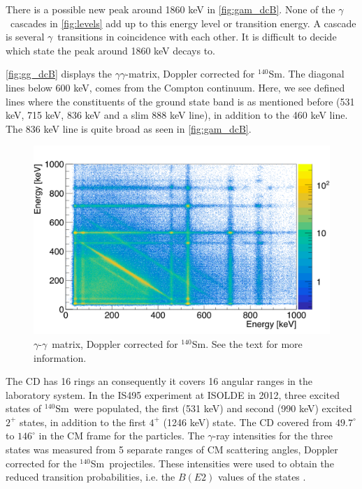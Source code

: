 \documentclass[twoside,english]{uiofysmaster/uiofysmaster}
\newcommand{\Sm}{$^{140}$Sm} %
\newcommand{\ga}{$\gamma$}
\let\orgautoref\autoref
\renewcommand{\autoref}
        {%
		 \def\sectionautorefname{Section}%
		 \def\subsectionautorefname{Section}%
		 \def\subsubsectionautorefname{Section}%
		 \def\chapterautorefname{Chapter}%
          \orgautoref}
\begin{document}
There is a possible new peak around 1860 keV in \autoref{fig:gam_dcB}. 
None of the \ga\ cascades in \autoref{fig:levels} add up to this energy level or transition energy. 
A cascade is several \ga\ transitions in coincidence with each other.
It is difficult to decide which state the peak around 1860 keV decays to.

\autoref{fig:gg_dcB} displays the \ga\ga-matrix, Doppler corrected for \Sm.
The diagonal lines below 600 keV, comes from the Compton continuum. 
Here, we see defined lines where the constituents of the ground state band is as mentioned before (531 keV, 715 keV, 836 keV and a slim 888 keV line), in addition to the 460 keV line. 
The 836 keV line is quite broad as seen in \autoref{fig:gam_dcB}.

\begin{figure}[htb!]
	\centering
	\includegraphics[width=\textwidth]{../Plots/plotting/gg_dcB.png}
	\caption{\ga-\ga\ matrix, Doppler corrected for \Sm. 
	See the text for more information.}
	\label{fig:gg_dcB}
\end{figure}


The CD has 16 rings an consequently it covers 16 angular ranges in the laboratory system.
In the IS495 experiment at ISOLDE in 2012, three excited states of \Sm\ were populated, the first (531 keV) and second (990 keV) excited $2^+$ states, in addition to the first $4^+$ (1246 keV) state.
The CD covered from $49.7^\circ$ to $146^\circ$ in the CM frame for the particles.
The \ga-ray intensities for the three states was measured from 5 separate ranges of CM scattering angles, Doppler corrected for the \Sm\ projectiles. 
These intensities were used to obtain the reduced transition probabilities, i.e. the $B(E2)$ values of the states \cite{Klintefjord2015, Klintefjord2016, BelloGarrote2015}.
\end{document}
